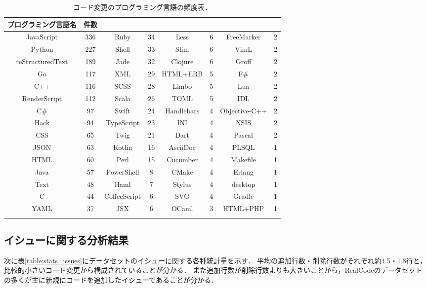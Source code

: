 \begin{table}[!b]
    \small
    \centering
    \caption{コード変更のプログラミング言語の頻度表．} 
    \label{table:issue_lang_freq}
    \begin{tabular}{c | c || c | c || c | c || c | c} \Xhline{3\arrayrulewidth}
        プログラミング言語名 & 件数 &  &  &  &  &  &   \\ \hline \hline
        JavaScript & 336 & Ruby & 34 & Less & 6 & FreeMarker & 2 \\
        Python & 227 & Shell & 33 & Slim & 6 & VimL & 2 \\
        reStructuredText & 189 & Jade & 32 & Clojure & 6 & Groff & 2 \\
        Go & 117 & XML & 29 & HTML+ERB & 5 & F# & 2 \\
        C++ & 116 & SCSS & 28 & Limbo & 5 & Lua & 2 \\
        RenderScript & 112 & Scala & 26 & TOML & 5 & IDL & 2 \\
        C# & 97 & Swift & 24 & Handlebars & 4 & Objective-C++ & 2 \\
        Hack & 94 & TypeScript & 23 & INI & 4 & NSIS & 2 \\
        CSS & 65 & Twig & 21 & Dart & 4 & Pascal & 2 \\
        JSON & 63 & Kotlin & 16 & AsciiDoc & 4 & PLSQL & 1 \\
        HTML & 60 & Perl & 15 & Cucumber & 4 & Makefile & 1 \\
        Java & 57 & PowerShell & 8 & CMake & 4 & Erlang & 1 \\
        Text & 48 & Haml & 7 & Stylus & 4 & desktop & 1 \\
        C & 44 & CoffeeScript & 6 & SVG & 4 & Gradle & 1 \\
        YAML & 37 & JSX & 6 & OCaml & 3 & HTML+PHP & 1 \\

        \Xhline{3\arrayrulewidth}
    \end{tabular}
\end{table}

\subsection{イシューに関する分析結果}

次に表\ref{table:stats_issues}にデータセットのイシューに関する各種統計量を示す．
平均の追加行数・削除行数がそれぞれ約4.5・1.8行と，比較的小さいコード変更から構成されていることが分かる．
また追加行数が削除行数よりも大きいことから，RealCodeのデータセットの多くが主に新規にコードを追加したイシューであることが分かる．

